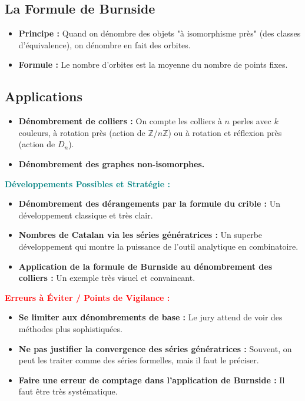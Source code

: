 \documentclass[12pt, a4paper, parskip=full]{report}
\theoremstyle{agregstyle}
\newenvironment{developpements}
  {\par\medskip\noindent\begin{oframed}\noindent\textbf{\textcolor{teal}{Développements Possibles et Stratégie :}}}
  {\end{oframed}\par\medskip}
\newenvironment{erreurs}
  {\par\medskip\noindent\begin{oframed}\noindent\textbf{\textcolor{red}{Erreurs à Éviter / Points de Vigilance :}}}
  {\end{oframed}\par\medskip}
\begin{document}
\subsection{La Formule de Burnside}
\begin{itemize}
    \item \textbf{Principe :} Quand on dénombre des objets "à isomorphisme près" (des classes d'équivalence), on dénombre en fait des orbites.
    \item \textbf{Formule :} Le nombre d'orbites est la moyenne du nombre de points fixes.
\end{itemize}
\subsection{Applications}
\begin{itemize}
    \item \textbf{Dénombrement de colliers :} On compte les colliers à $n$ perles avec $k$ couleurs, à rotation près (action de $\mathbb{Z}/n\mathbb{Z}$) ou à rotation et réflexion près (action de $D_n$).
    \item \textbf{Dénombrement des graphes non-isomorphes.}
\end{itemize}

\begin{developpements}
    \begin{itemize}
        \item \textbf{Dénombrement des dérangements par la formule du crible :} Un développement classique et très clair.
        \item \textbf{Nombres de Catalan via les séries génératrices :} Un superbe développement qui montre la puissance de l'outil analytique en combinatoire.
        \item \textbf{Application de la formule de Burnside au dénombrement des colliers :} Un exemple très visuel et convaincant.
    \end{itemize}
\end{developpements}

\begin{erreurs}
    \begin{itemize}
        \item \textbf{Se limiter aux dénombrements de base :} Le jury attend de voir des méthodes plus sophistiquées.
        \item \textbf{Ne pas justifier la convergence des séries génératrices :} Souvent, on peut les traiter comme des séries formelles, mais il faut le préciser.
        \item \textbf{Faire une erreur de comptage dans l'application de Burnside :} Il faut être très systématique.
    \end{itemize}
\end{erreurs}
\end{document}
